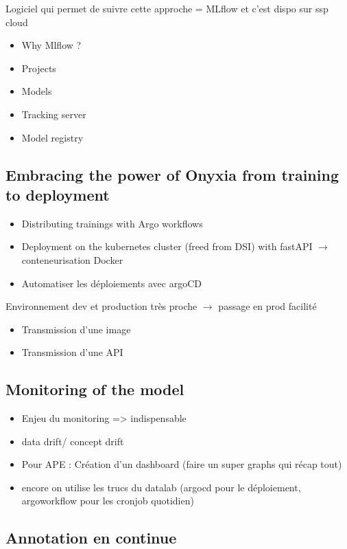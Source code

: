 Logiciel qui permet de suivre cette approche = MLflow et c'est dispo sur ssp cloud

\begin{itemize}
    \item Why Mlflow ?
    \item Projects
    \item Models
    \item Tracking server
    \item Model registry
\end{itemize}

\subsection{Embracing the power of Onyxia from training to deployment}

\begin{itemize}
    \item Distributing trainings with Argo workflows
    \item Deployment on the kubernetes cluster (freed from DSI) with fastAPI  $\rightarrow$ conteneurisation Docker
    \item Automatiser les déploiements avec argoCD
\end{itemize}

Environnement dev et production très proche $\rightarrow$ passage en prod facilité
\begin{itemize}
    \item Transmission d'une image
    \item Transmission d'une API
\end{itemize}

\subsection{Monitoring of the model}

\begin{itemize}
    \item Enjeu du monitoring => indispensable
    \item data drift/ concept drift
    \item Pour APE : Création d'un dashboard (faire un super graphs qui récap tout)
    \item encore on utilise les trucs du datalab (argocd pour le déploiement, argoworkflow pour les cronjob quotidien)
\end{itemize}

\subsection{Annotation en continue}

